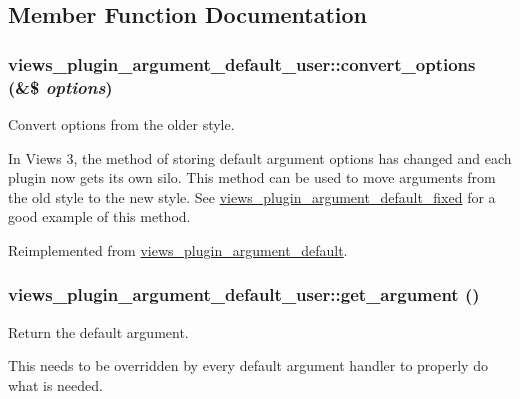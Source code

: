 \subsection{Member Function Documentation}
\hypertarget{classviews__plugin__argument__default__user_ae184e4a33635d3e1e29cdbbfbb4c0c72}{
\subsubsection[{convert\_\-options}]{\setlength{\rightskip}{0pt plus 5cm}views\_\-plugin\_\-argument\_\-default\_\-user::convert\_\-options (\&\$ {\em options})}}
\label{classviews__plugin__argument__default__user_ae184e4a33635d3e1e29cdbbfbb4c0c72}
Convert options from the older style.

In Views 3, the method of storing default argument options has changed and each plugin now gets its own silo. This method can be used to move arguments from the old style to the new style. See \hyperlink{classviews__plugin__argument__default__fixed}{views\_\-plugin\_\-argument\_\-default\_\-fixed} for a good example of this method. 

Reimplemented from \hyperlink{classviews__plugin__argument__default_a4f4afb816d9f6451a7d070fa7b75c8c2}{views\_\-plugin\_\-argument\_\-default}.\hypertarget{classviews__plugin__argument__default__user_af7dc56a3ce8a8cf8ad12595952dc70e6}{
\subsubsection[{get\_\-argument}]{\setlength{\rightskip}{0pt plus 5cm}views\_\-plugin\_\-argument\_\-default\_\-user::get\_\-argument ()}}
\label{classviews__plugin__argument__default__user_af7dc56a3ce8a8cf8ad12595952dc70e6}
Return the default argument.

This needs to be overridden by every default argument handler to properly do what is needed. 


